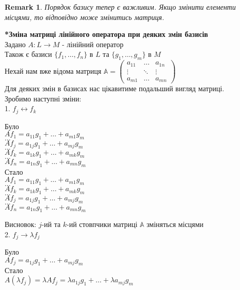 \documentclass[a4paper, 10pt]{article}
\theoremstyle{theoremdd}
\newtheorem{remark}[theorem]{Remark}
\begin{document}
	\begin{remark}
	Порядок базису тепер є важливим. Якщо змінити елементи місцями, то відповідно може змінитись матриця.
	\end{remark}
	\iffalse
	\textbf{*Зміна матриці лінійного оператора при деяких змін базисів}\\
	Задано $A: L \to M$ - лінійний оператор \\ Також є базиси $\{f_1,\dots,f_n\}$ в $L$ та $\{g_1,\dots,g_m\}$ в $M$\\
	Нехай нам вже відома матриця $\mathbb{A} = \begin{pmatrix}
	a_{11} & \dots & a_{1n} \\
	\vdots & \ddots & \vdots \\
	a_{m1} & \dots & a_{mn}
	\end{pmatrix}$\\
	Для деяких змін в базисах нас цікавитиме подальший вигляд матриці.\\
	Зробимо наступні зміни:
	\bigskip \\
	1. $f_j \longleftrightarrow f_k$
\multicolsep=0pt
	\begin{multicols}{2}
	Було \\
$Af_1 = a_{11}g_1 + \dots + a_{m1}g_m$ \\
$\dots$ \\
$Af_j = a_{1j}g_1 + \dots + a_{mj}g_m$ \\
$\dots$ \\
$Af_k = a_{1k}g_1 + \dots + a_{mk}g_m$ \\
$\dots$ \\
$Af_n = a_{1n}g_1 + \dots + a_{mn}g_m$
	\columnbreak
	\\
	Стало \\
$Af_1 = a_{11}g_1 + \dots + a_{m1}g_m$ \\
$\dots$ \\
$Af_k = a_{1k}g_1 + \dots + a_{mk}g_m$\\
$\dots$ \\
$Af_j = a_{1j}g_1 + \dots + a_{mj}g_m$\\
$\dots$ \\
$Af_n = a_{1n}g_1 + \dots + a_{mn}g_m$
	\end{multicols}
	Висновок: $j$-ий та $k$-ий стовпчики матриці $\mathbb{A}$ зміняться місцями
	\bigskip \\
	2. $f_j \rightarrow \lambda f_j$
\multicolsep=0pt
	\begin{multicols}{2}
	Було \\
$Af_j = a_{1j}g_1 + \dots + a_{mj}g_m$
	\columnbreak
	\\
	Стало \\
$A(\lambda f_j) = \lambda Af_j = \lambda a_{1j}g_1 + \dots + \lambda a_{mj}g_m$
	\end{multicols}
\end{document}
